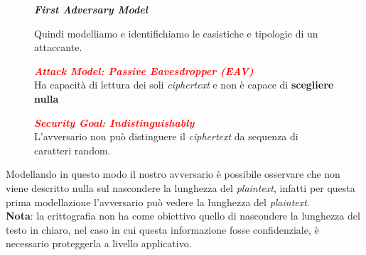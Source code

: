 \begin{figure}[h]
    \centering
    \begin{large}
        \textbf{\textit{First Adversary Model}} \\
    \end{large}
    Quindi modelliamo e identifichiamo le casistiche e tipologie di un attaccante. \\

    \begin{minipage}[t]{0.50\textwidth}
        \centering
        \begin{boxA}
            \textcolor{red}{\textbf{\textit{Attack Model: Passive Eavesdropper (EAV)}}} \\
            Ha capacità di lettura dei soli \textit{ciphertext} e non è capace di \textbf{scegliere nulla}
        \end{boxA}
    \end{minipage}
    \hfill
    \begin{minipage}[t]{0.45\textwidth}
        \centering
        \begin{boxA}
            \textcolor{red}{\textbf{\textit{Security Goal: Indistinguishably}}} \\
            L'avversario non può distinguere il \textit{ciphertext} da sequenza di caratteri random.
        \end{boxA}
    \end{minipage}
\end{figure}

\begin{flushleft}
    Modellando in questo modo il nostro avversario è possibile osservare che non viene descritto nulla sul nascondere la lunghezza del \textit{plaintext}, infatti per questa prima modellazione l'avversario può vedere la lunghezza del \textit{plaintext}. \\
    \textbf{Nota}: la crittografia non ha come obiettivo quello di nascondere la lunghezza del testo in chiaro, nel caso in cui questa informazione fosse confidenziale, è necessario proteggerla a livello applicativo.
\end{flushleft}

